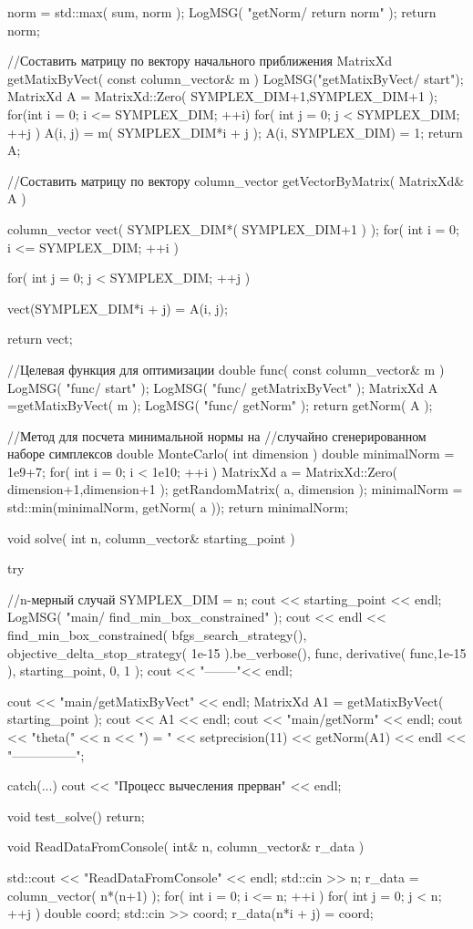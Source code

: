 \documentclass[12pt, a4paper]{extarticle}
\begin{document}
\begin{listing}[1]{1}
{{		norm = std::max( sum, norm );
	}
	LogMSG( "getNorm/ return norm" );
	return norm;
}

//Составить матрицу по вектору начального приближения
MatrixXd getMatixByVect( const column_vector& m )
{
	LogMSG("getMatixByVect/ start");
	MatrixXd A = MatrixXd::Zero( SYMPLEX_DIM+1,SYMPLEX_DIM+1 );
	for(int i = 0; i <= SYMPLEX_DIM; ++i)
	{
		for( int j = 0; j < SYMPLEX_DIM; ++j )
		{
			A(i, j) = m( SYMPLEX_DIM*i + j );
		}
		A(i, SYMPLEX_DIM) = 1;
	}
	return A;
}

//Составить матрицу по вектору
column_vector getVectorByMatrix( MatrixXd& A )
{
	column_vector vect( SYMPLEX_DIM*( SYMPLEX_DIM+1 ) );
	for( int i = 0; i <= SYMPLEX_DIM; ++i )
	{
		for( int j = 0; j < SYMPLEX_DIM; ++j )
		{
			vect(SYMPLEX_DIM*i + j) = A(i, j);
			
		}
	}
	return vect;
}

//Целевая функция для оптимизации
double func( const column_vector& m )
{
	LogMSG( "func/ start" );
	LogMSG( "func/ getMatrixByVect" );
	MatrixXd A =getMatixByVect( m );
	LogMSG( "func/ getNorm" );
	return getNorm( A );
}

//Метод для посчета минимальной нормы на
//случайно сгенерированном наборе симплексов
double MonteCarlo( int dimension )
{
	double minimalNorm = 1e9+7;
	for( int i = 0; i < 1e10; ++i )
	{
		MatrixXd a = MatrixXd::Zero( dimension+1,dimension+1 );
		getRandomMatrix( a, dimension );
		minimalNorm = std::min(minimalNorm, getNorm( a ));
	}
	return minimalNorm;
}

void solve( int n, column_vector& starting_point )
{
	try
	{
		//n-мерный случай
		SYMPLEX_DIM = n;
		cout << starting_point << endl;
		LogMSG( "main/ find_min_box_constrained" );
		cout << endl <<  find_min_box_constrained(
		bfgs_search_strategy(),
		objective_delta_stop_strategy( 1e-15 ).be_verbose(),
		func,
		derivative( func,1e-15 ),
		starting_point, 0, 1 );
		cout << "--------"<< endl;
		
		cout << "main/getMatixByVect" << endl;
		MatrixXd A1 = getMatixByVect( starting_point );
		cout << A1 << endl;
		cout << "main/getNorm" << endl;
		cout << "theta(" << n << ") = " << setprecision(11)
		<< getNorm(A1) << endl << "---------------\n";
	}
	catch(...){
		cout << "Процесс вычесления прерван" << endl;
	}
}

void test_solve()
{
	return;
}

void ReadDataFromConsole( int& n, column_vector& r_data )
{
	std::cout << "ReadDataFromConsole" << endl;
	std::cin >> n;
	r_data = column_vector( n*(n+1) );
	for( int i = 0; i <= n; ++i )
	{
		for( int j = 0; j < n; ++j )
		{
			double coord;
			std::cin >> coord;
			r_data(n*i + j) = coord;
		}
	}
	
}
\end{listing}
\end{document}
